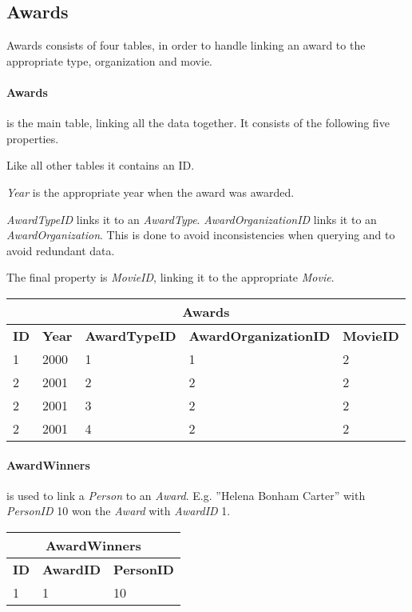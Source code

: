 \subsection{Awards}

Awards consists of four tables, in order to handle linking an award to the appropriate type, organization and movie.

\paragraph{Awards} is the main table, linking all the data together.
It consists of the following five properties.

Like all other tables it contains an ID.

\textit{Year} is the appropriate year when the award was awarded.

\textit{AwardTypeID} links it to an \textit{AwardType}.
\textit{AwardOrganizationID} links it to an \textit{AwardOrganization}.
This is done to avoid inconsistencies when querying and to avoid redundant data.

The final property is \textit{MovieID}, linking it to the appropriate \textit{Movie}.

\begin{center}
\begin{tabular}{|l|l|l|l|l|}
\hline
\multicolumn{5}{|c|}{Awards} \\ \hline \hline
\textbf{ID} & \textbf{Year} & \textbf{AwardTypeID} & \textbf{AwardOrganizationID} & \textbf{MovieID} \\ \hline \hline
1 & 2000 & 1 & 1 & 2 \\ \hline
2 & 2001 & 2 & 2 & 2 \\ \hline
2 & 2001 & 3 & 2 & 2 \\ \hline
2 & 2001 & 4 & 2 & 2 \\ \hline
\end{tabular}
\end{center}

\paragraph{AwardWinners} is used to link a \textit{Person} to an \textit{Award}.
E.g. ''Helena Bonham Carter'' with \textit{PersonID} 10 won the \textit{Award} with \textit{AwardID} 1.

\begin{center}
\begin{tabular}{|l|l|l|}
\hline
\multicolumn{3}{|c|}{AwardWinners} \\ \hline \hline
\textbf{ID} & \textbf{AwardID} & \textbf{PersonID} \\ \hline \hline
1 & 1 & 10 \\ \hline
\end{tabular}
\end{center}

